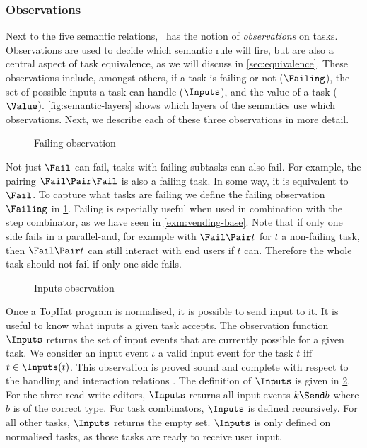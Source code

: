 \subsubsection{Observations}
\label{sec:observations}

Next to the five semantic relations, \TOPHAT\ has the notion of \emph{observations} on tasks.
Observations are used to decide which semantic rule will fire,
but are also a central aspect of task equivalence,
as we will discuss in \cref{sec:equivalence}.
These observations include, amongst others,
if a task is failing or not ($\Failing$),
the set of possible inputs a task can handle ($\Inputs$),
and the value of a task ($\Value$).
\cref{fig:semantic-layers} shows which layers of the semantics use which observations.
Next, we describe each of these three observations in more detail.

\begin{figure}
  \caption{Failing observation}
  \label{fig:observation-failing}
\end{figure}

Not just $\Fail$ can fail, tasks with failing subtasks can also fail.
For example, the pairing $\Fail \Pair \Fail$ is also a failing task.
In some way, it is equivalent to $\Fail$.
To capture what tasks are failing we define the failing observation $\Failing$ in \cref{fig:observation-failing}.
Failing is especially useful when used in combination with the step combinator,
as we have seen in \cref{exm:vending-base}.
Note that if only one side fails in a parallel-and,
for example with $\Fail \Pair t$ for $t$ a non-failing task,
then $\Fail \Pair t$ can still interact with end users if $t$ can.
Therefore the whole task should not fail if only one side fails.

\begin{figure}
  \caption{Inputs observation}
  \label{fig:observation-inputs}
\end{figure}

Once a TopHat program is normalised, it is possible to send input to it.
It is useful to know what inputs a given task accepts.
The observation function $\Inputs$ returns the set of input events that are currently possible for a given task.
We consider an input event $\iota$ a valid input event for the task $t$ iff $t \in \Inputs(t)$.
This observation is proved sound and complete with respect to the handling and interaction relations \cite{Steenvoorden22}.
The definition of $\Inputs$ is given in \cref{fig:observation-inputs}.
For the three read-write editors, $\Inputs$ returns all input events $k \Send b$ where $b$ is of the correct type.
For task combinators, $\Inputs$ is defined recursively.
For all other tasks, $\Inputs$ returns the empty set.
$\Inputs$ is only defined on normalised tasks, as those tasks are ready to receive user input.

